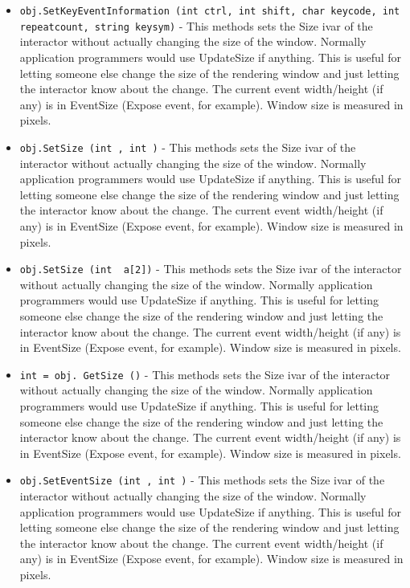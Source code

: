 \begin{itemize}
\item  \verb|obj.SetKeyEventInformation (int ctrl, int shift, char keycode, int repeatcount, string keysym)| -  This methods sets the Size ivar of the interactor without
 actually changing the size of the window. Normally
 application programmers would use UpdateSize if anything.
 This is useful for letting someone else change the size of
 the rendering window and just letting the interactor
 know about the change.
 The current event width/height (if any) is in EventSize 
 (Expose event, for example).
 Window size is measured in pixels.

\item  \verb|obj.SetSize (int , int )| -  This methods sets the Size ivar of the interactor without
 actually changing the size of the window. Normally
 application programmers would use UpdateSize if anything.
 This is useful for letting someone else change the size of
 the rendering window and just letting the interactor
 know about the change.
 The current event width/height (if any) is in EventSize 
 (Expose event, for example).
 Window size is measured in pixels.

\item  \verb|obj.SetSize (int  a[2])| -  This methods sets the Size ivar of the interactor without
 actually changing the size of the window. Normally
 application programmers would use UpdateSize if anything.
 This is useful for letting someone else change the size of
 the rendering window and just letting the interactor
 know about the change.
 The current event width/height (if any) is in EventSize 
 (Expose event, for example).
 Window size is measured in pixels.

\item  \verb|int = obj. GetSize ()| -  This methods sets the Size ivar of the interactor without
 actually changing the size of the window. Normally
 application programmers would use UpdateSize if anything.
 This is useful for letting someone else change the size of
 the rendering window and just letting the interactor
 know about the change.
 The current event width/height (if any) is in EventSize 
 (Expose event, for example).
 Window size is measured in pixels.

\item  \verb|obj.SetEventSize (int , int )| -  This methods sets the Size ivar of the interactor without
 actually changing the size of the window. Normally
 application programmers would use UpdateSize if anything.
 This is useful for letting someone else change the size of
 the rendering window and just letting the interactor
 know about the change.
 The current event width/height (if any) is in EventSize 
 (Expose event, for example).
 Window size is measured in pixels.


\end{itemize}
